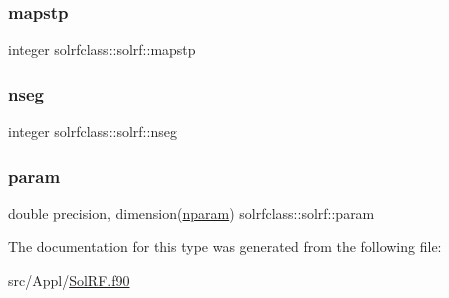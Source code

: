 \mbox{\label{structsolrfclass_1_1solrf_af5533539dedb70fb85e93b1a76a7a55d}} 
\subsubsection{\texorpdfstring{mapstp}{mapstp}}
{\footnotesize\ttfamily integer solrfclass\+::solrf\+::mapstp}

\mbox{\label{structsolrfclass_1_1solrf_a1825472ba9b6dfe1d7ca72bfc85f0532}} 
\subsubsection{\texorpdfstring{nseg}{nseg}}
{\footnotesize\ttfamily integer solrfclass\+::solrf\+::nseg}

\mbox{\label{structsolrfclass_1_1solrf_a10deafd1e7cbd79c86c62766f73105f9}} 
\subsubsection{\texorpdfstring{param}{param}}
{\footnotesize\ttfamily double precision, dimension(\mbox{\hyperlink{namespacesolrfclass_a01b965e25069cff9fb1797fbbcb9939d}{nparam}}) solrfclass\+::solrf\+::param}



The documentation for this type was generated from the following file\+:\begin{DoxyCompactItemize}
\item 
src/\+Appl/\mbox{\hyperlink{_sol_r_f_8f90}{Sol\+R\+F.\+f90}}\end{DoxyCompactItemize}
